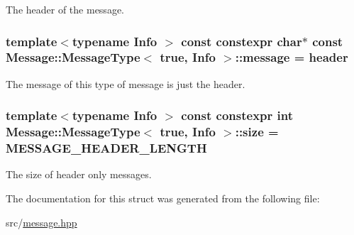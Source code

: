 The header of the message. 

\subsubsection[{\texorpdfstring{message}{message}}]{\setlength{\rightskip}{0pt plus 5cm}template$<$typename Info $>$ const constexpr char$\ast$ const {\bf Message\+::\+Message\+Type}$<$ true, Info $>$\+::message = {\bf header}\hspace{0.3cm}{\ttfamily [static]}}\hypertarget{struct_message_1_1_message_type_3_01true_00_01_info_01_4_a7da3fc36e70029f1aab4b702dc88f764}{}\label{struct_message_1_1_message_type_3_01true_00_01_info_01_4_a7da3fc36e70029f1aab4b702dc88f764}


The message of this type of message is just the header. 

\subsubsection[{\texorpdfstring{size}{size}}]{\setlength{\rightskip}{0pt plus 5cm}template$<$typename Info $>$ const constexpr int {\bf Message\+::\+Message\+Type}$<$ true, Info $>$\+::size = {\bf M\+E\+S\+S\+A\+G\+E\+\_\+\+H\+E\+A\+D\+E\+R\+\_\+\+L\+E\+N\+G\+TH}\hspace{0.3cm}{\ttfamily [static]}}\hypertarget{struct_message_1_1_message_type_3_01true_00_01_info_01_4_a2cc4f5dbfaba4502c6209e73836c96f1}{}\label{struct_message_1_1_message_type_3_01true_00_01_info_01_4_a2cc4f5dbfaba4502c6209e73836c96f1}


The size of header only messages. 



The documentation for this struct was generated from the following file\+:\begin{DoxyCompactItemize}
\item 
src/\hyperlink{message_8hpp}{message.\+hpp}\end{DoxyCompactItemize}
